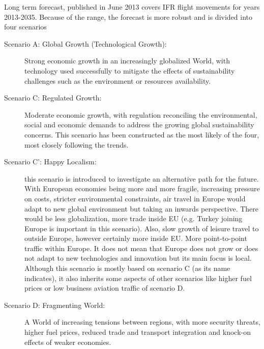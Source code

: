Long term forecast, published in June 2013 covers IFR flight movements for years 2013-2035. Because of the range, the forecast is more robust and is divided into four scenarios \citep{growth_2013}

\begin{description}
\item[Scenario A: Global Growth (Technological Growth):] Strong economic growth in an increasingly globalized World, with technology used successfully to mitigate the effects of sustainability challenges such as the environment or resources availability.
\item[Scenario C: Regulated Growth:] Moderate economic growth, with regulation reconciling the environmental, social and economic demands to address the growing global sustainability concerns. This scenario has been constructed as the most likely of the four, most closely following the trends.
\item[Scenario C’: Happy Localism:] this scenario is introduced to investigate an alternative path for the future. With European economies being more and more fragile, increasing pressure on costs, stricter environmental constraints, air travel in Europe would adapt to new global environment but taking an inwards perspective. There would be less globalization, more trade inside EU (e.g. Turkey joining Europe is important in this scenario). Also, slow growth of leisure travel to outside Europe, however certainly more inside EU. More point-to-point traffic within Europe. It does not mean that Europe does not grow or does not adapt to new technologies and innovation but its main focus is local. Although this scenario is mostly based on scenario C (as its name indicates), it also inherits some aspects of other scenarios like higher fuel prices or low business aviation traffic of scenario D.
\item[Scenario D: Fragmenting World:] A World of increasing tensions between regions, with more security threats, higher fuel prices, reduced trade and transport integration and knock-on effects of weaker economies.
\end{description}

%

